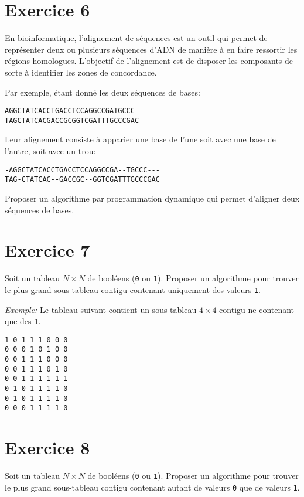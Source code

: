 \documentclass[a4paper,10pt]{article}
\begin{document}
\section*{Exercice 6}

En bioinformatique, l'alignement de séquences est un outil qui permet de représenter
deux ou plusieurs séquences d'ADN de manière à en faire ressortir les régions
homologues. L'objectif de l'alignement est de disposer les composants de sorte
à identifier les zones de concordance.

Par exemple, étant donné les deux séquences de bases:

\begin{verbatim}
AGGCTATCACCTGACCTCCAGGCCGATGCCC
TAGCTATCACGACCGCGGTCGATTTGCCCGAC
\end{verbatim}

Leur alignement consiste à apparier une base de l'une soit avec une base de
l'autre, soit avec un trou:

\begin{verbatim}
-AGGCTATCACCTGACCTCCAGGCCGA--TGCCC---
TAG-CTATCAC--GACCGC--GGTCGATTTGCCCGAC
\end{verbatim}

Proposer un algorithme par programmation dynamique qui permet d'aligner deux séquences de bases.


\section*{Exercice 7}

Soit un tableau $N \times N$ de booléens (\texttt{0} ou \texttt{1}). Proposer un algorithme pour trouver le plus grand sous-tableau contigu contenant uniquement des valeurs \texttt{1}.

\textit{Exemple:} Le tableau suivant contient un sous-tableau $4 \times 4$ contigu ne contenant que des \texttt{1}.

\begin{verbatim}
1 0 1 1 1 0 0 0
0 0 0 1 0 1 0 0
0 0 1 1 1 0 0 0
0 0 1 1 1 0 1 0
0 0 1 1 1 1 1 1
0 1 0 1 1 1 1 0
0 1 0 1 1 1 1 0
0 0 0 1 1 1 1 0
\end{verbatim}


\section*{Exercice 8}

Soit un tableau $N \times N$ de booléens (\texttt{0} ou \texttt{1}). Proposer un algorithme pour trouver le plus grand sous-tableau contigu contenant autant de valeurs \texttt{0} que de valeurs \texttt{1}.
\end{document}
